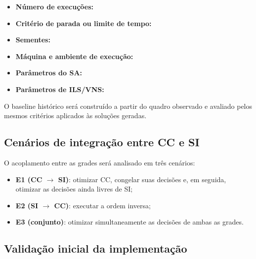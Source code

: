 \begin{itemize}
    \item \textbf{Número de execuções:} 
    \item \textbf{Critério de parada ou limite de tempo:} 
    \item \textbf{Sementes:} 
    \item \textbf{Máquina e ambiente de execução:} 
    \item \textbf{Parâmetros do SA:} 
    \item \textbf{Parâmetros de ILS/VNS:} 
\end{itemize}

O baseline histórico será construído a partir do quadro observado e avaliado pelos mesmos critérios aplicados às soluções geradas. 

\subsection{Cenários de integração entre CC e SI}

O acoplamento entre as grades será analisado em três cenários:
\begin{itemize}
    \item \textbf{E1 (CC $\rightarrow$ SI)}: otimizar CC, congelar suas decisões e, em seguida, otimizar as decisões ainda livres de SI;
    \item \textbf{E2 (SI $\rightarrow$ CC)}: executar a ordem inversa;
    \item \textbf{E3 (conjunto)}: otimizar simultaneamente as decisões de ambas as grades.
\end{itemize}


\subsection{Validação inicial da implementação}
\label{subsec:validacao_inicial}

